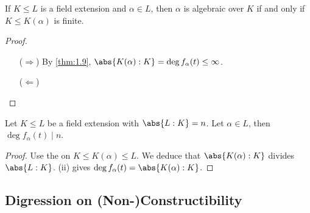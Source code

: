 \documentclass{article}
\begin{document}
\begin{ncor}\label{cor:1.10}
    If $K \leq L$ is a field extension and $\alpha \in L$, then $\alpha$ is algebraic over $K$ if and only if $K \leq K(\alpha)$ is finite.
\end{ncor}
\begin{proof} \leavevmode
    \begin{itemize}
        \item[($\Rightarrow$)] By \cref{thm:1.9}, $\abs{K(\alpha):K} = \deg f_\alpha(t) \leq \infty$.
        \item [($\Leftarrow$)] 
    \end{itemize}
\end{proof}
\begin{ncor}\label{cor:1.11}
    Let $K \leq L$ be a field extension with $\abs{L:K} = n$. Let $\alpha \in L$, then $\deg f_\alpha(t) \mid n$.
\end{ncor}
\begin{proof}
    Use the  on $K \leq K(\alpha) \leq L$.
    We deduce that $\abs{K(\alpha):K}$ divides $\abs{L:K}$.
    (ii) gives $\deg f_\alpha(t) = \abs{K(\alpha) : K}$.
\end{proof}
\subsection{Digression on (Non-)Constructibility}
\end{document}
